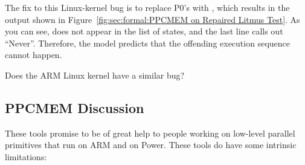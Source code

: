 The fix to this Linux-kernel bug is to replace P0's  with
, which results in the output shown in
Figure~\ref{fig:sec:formal:PPCMEM on Repaired Litmus Test}.
As you can see,  does not appear in the list of states,
and the last line calls out ``Never''.
Therefore, the model predicts that the offending execution sequence
cannot happen.

\QuickQuiz{}
	Does the ARM Linux kernel have a similar bug?
 \QuickQuizEnd

\subsection{PPCMEM Discussion}
\label{sec:formal:PPCMEM Discussion}

These tools promise to be of great help to people working on low-level
parallel primitives that run on ARM and on Power. These tools do have
some intrinsic limitations:

